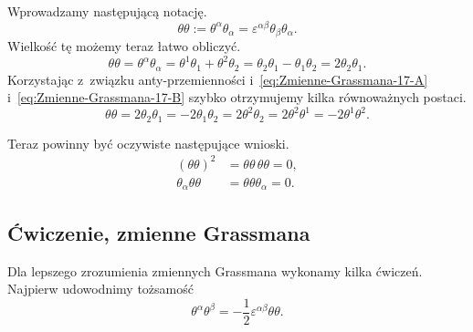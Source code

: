 \documentclass[a4paper,11pt]{article}
\begin{document}
Wprowadzamy następującą notację.
\begin{equation}
  \label{eq:Zmienne-Grassmana-18}
  \theta \theta := \theta^{ \alpha } \theta_{ \alpha } = \varepsilon^{ \alpha \beta } \theta_{ \beta } \theta_{ \alpha }.
\end{equation}
Wielkość tę możemy teraz łatwo obliczyć.
\begin{equation}
  \label{eq:Zmienne-Grassmana-19}
  \theta \theta = \theta^{ \alpha } \theta_{ \alpha } = \theta^{ 1 } \theta_{ 1 } + \theta^{ 2 } \theta_{ 2 }
  = \theta_{ 2 } \theta_{ 1 } - \theta_{ 1 } \theta_{ 2 } = 2 \theta_{ 2 } \theta_{ 1 }.
\end{equation}
Korzystając z~związku anty-przemienności i~\eqref{eq:Zmienne-Grassmana-17-A} i~\eqref{eq:Zmienne-Grassmana-17-B} szybko otrzymujemy kilka równoważnych postaci.
\begin{equation}
  \label{eq:Zmienne-Grassmana-20}
  \theta \theta = 2 \theta_{ 2 } \theta_{ 1 } = -2 \theta_{ 1 } \theta_{ 2 } = 2 \theta^{ 2 } \theta_{ 2 }
  = 2 \theta^{ 2 } \theta^{ 1 } = -2 \theta^{ 1 } \theta^{ 2 }.
\end{equation}

Teraz powinny być oczywiste następujące wnioski.
\begin{subequations}
  \begin{align}
  \label{eq:13}
    ( \theta \theta )^{ 2 } &= \theta \theta \, \theta \theta = 0, \\
    \theta_{ \alpha } \theta \theta &= \theta \theta \theta_{ \alpha } = 0.
  \end{align}
\end{subequations}










\subsection{Ćwiczenie, zmienne Grassmana}


Dla lepszego zrozumienia zmiennych Grassmana wykonamy kilka ćwiczeń. Najpierw udowodnimy tożsamość
\begin{equation}
  \label{eq:4}
  \theta^{ \alpha } \theta^{ \beta } = -\frac{ 1 }{ 2 } \varepsilon^{ \alpha \beta } \theta \theta.
\end{equation}
\end{document}
